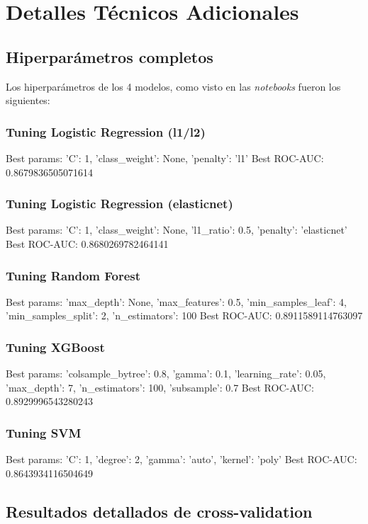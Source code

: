 \documentclass[conference]{IEEEtran}
\begin{document}
\printbibliography

\appendices

\section{Detalles Técnicos Adicionales}
\subsection{Hiperparámetros completos}

Los hiperparámetros de los 4 modelos, como visto en las \emph{notebooks} fueron los siguientes:

\subsubsection{Tuning Logistic Regression (l1/l2)}
Best params: {'C': 1, 'class_weight': None, 'penalty': 'l1'}
Best ROC-AUC: 0.8679836505071614
\subsubsection{Tuning Logistic Regression (elasticnet)}
Best params: {'C': 1, 'class_weight': None, 'l1_ratio': 0.5, 'penalty': 'elasticnet'}
Best ROC-AUC: 0.8680269782464141
\subsubsection{Tuning Random Forest}
Best params: {'max_depth': None, 'max_features': 0.5, 'min_samples_leaf': 4, 'min_samples_split': 2, 'n_estimators': 100}
Best ROC-AUC: 0.8911589114763097
\subsubsection{Tuning XGBoost}
Best params: {'colsample_bytree': 0.8, 'gamma': 0.1, 'learning_rate': 0.05, 'max_depth': 7, 'n_estimators': 100, 'subsample': 0.7}
Best ROC-AUC: 0.8929996543280243
\subsubsection{Tuning SVM}
Best params: {'C': 1, 'degree': 2, 'gamma': 'auto', 'kernel': 'poly'}
Best ROC-AUC: 0.8643934116504649

\subsection{Resultados detallados de cross-validation}
\end{document}
